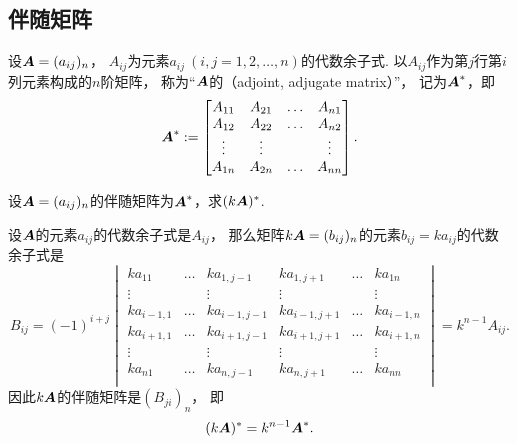 \subsection{伴随矩阵}
\begin{definition}\label{definition:伴随矩阵.伴随矩阵的定义}
设\(\boldsymbol{A}=(a_{ij})_n\)，
\(A_{ij}\)为元素\(a_{ij}\ (i,j=1,2,\dotsc,n)\)的代数余子式.
以\(A_{ij}\)作为第\(j\)行第\(i\)列元素构成的\(n\)阶矩阵，
称为“\(\boldsymbol{A}\)的（adjoint, adjugate matrix）”，
记为\(\boldsymbol{A}^*\)，即\begin{equation*}
	\boldsymbol{A}^*
	:=
	\begin{bmatrix}
		A_{11} & A_{21} & \dots & A_{n1} \\
		A_{12} & A_{22} & \dots & A_{n2} \\
		\vdots & \vdots & & \vdots \\
		A_{1n} & A_{2n} & \dots & A_{nn}
	\end{bmatrix}.
\end{equation*}
\end{definition}

\begin{example}
设\(\boldsymbol{A}=(a_{ij})_n\)的伴随矩阵为\(\boldsymbol{A}^*\)，求\((k\boldsymbol{A})^*\).
\begin{solution}
设\(\boldsymbol{A}\)的元素\(a_{ij}\)的代数余子式是\(A_{ij}\)，
那么矩阵\(k\boldsymbol{A} = (b_{ij})_n\)的元素\(b_{ij} = k a_{ij}\)的代数余子式是\begin{equation*}
	B_{ij}
	= (-1)^{i+j}
	\begin{vmatrix}
		k a_{11} & \dots & k a_{1,j-1} & k a_{1,j+1} & \dots & k a_{1n} \\
		\vdots & & \vdots & \vdots & & \vdots \\
		k a_{i-1,1} & \dots & k a_{i-1,j-1} & k a_{i-1,j+1} & \dots & k a_{i-1,n} \\
		k a_{i+1,1} & \dots & k a_{i+1,j-1} & k a_{i+1,j+1} & \dots & k a_{i+1,n} \\
		\vdots & & \vdots & \vdots & & \vdots \\
		k a_{n1} & \dots & k a_{n,j-1} & k a_{n,j+1} & \dots & k a_{nn} \\
	\end{vmatrix}
	= k^{n-1} A_{ij}.
\end{equation*}
因此\(k\boldsymbol{A}\)的伴随矩阵是\((B_{ji})_n\)，
即\begin{equation}\label{equation:行列式.伴随矩阵.数与矩阵乘积的伴随}
	(k \boldsymbol{A})^* = k^{n-1} \boldsymbol{A}^*.
\end{equation}
\end{solution}
\end{example}

